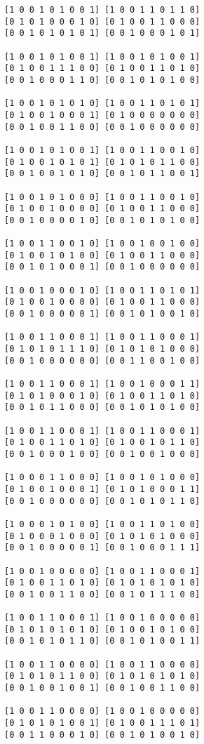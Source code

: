\begin{lstlisting}
[1 0 0 1 0 1 0 0 1] [1 0 0 1 1 0 1 1 0] 
[0 1 0 1 0 0 0 1 0] [0 1 0 0 1 1 0 0 0] 
[0 0 1 0 1 0 1 0 1] [0 0 1 0 0 0 1 0 1] 

[1 0 0 1 0 1 0 0 1] [1 0 0 1 0 1 0 0 1] 
[0 1 0 0 1 1 1 0 0] [0 1 0 0 1 1 0 1 0] 
[0 0 1 0 0 0 1 1 0] [0 0 1 0 1 0 1 0 0] 

[1 0 0 1 0 1 0 1 0] [1 0 0 1 1 0 1 0 1] 
[0 1 0 0 1 0 0 0 1] [0 1 0 0 0 0 0 0 0] 
[0 0 1 0 0 1 1 0 0] [0 0 1 0 0 0 0 0 0] 

[1 0 0 1 0 1 0 0 1] [1 0 0 1 1 0 0 1 0] 
[0 1 0 0 1 0 1 0 1] [0 1 0 1 0 1 1 0 0] 
[0 0 1 0 0 1 0 1 0] [0 0 1 0 1 1 0 0 1] 

[1 0 0 1 0 1 0 0 0] [1 0 0 1 1 0 0 1 0] 
[0 1 0 0 1 0 0 0 0] [0 1 0 0 1 1 0 0 0] 
[0 0 1 0 0 0 0 1 0] [0 0 1 0 1 0 1 0 0] 

[1 0 0 1 1 0 0 1 0] [1 0 0 1 0 0 1 0 0] 
[0 1 0 0 1 0 1 0 0] [0 1 0 0 1 1 0 0 0] 
[0 0 1 0 1 0 0 0 1] [0 0 1 0 0 0 0 0 0] 

[1 0 0 1 0 0 0 1 0] [1 0 0 1 1 0 1 0 1] 
[0 1 0 0 1 0 0 0 0] [0 1 0 0 1 1 0 0 0] 
[0 0 1 0 0 0 0 0 1] [0 0 1 0 1 0 0 1 0] 

[1 0 0 1 1 0 0 0 1] [1 0 0 1 1 0 0 0 1] 
[0 1 0 1 0 1 1 1 0] [0 1 0 1 0 1 0 0 0] 
[0 0 1 0 0 0 0 0 0] [0 0 1 1 0 0 1 0 0] 

[1 0 0 1 1 0 0 0 1] [1 0 0 1 0 0 0 1 1] 
[0 1 0 1 0 0 0 1 0] [0 1 0 0 1 1 0 1 0] 
[0 0 1 0 1 1 0 0 0] [0 0 1 0 1 0 1 0 0] 

[1 0 0 1 1 0 0 0 1] [1 0 0 1 1 0 0 0 1] 
[0 1 0 0 1 1 0 1 0] [0 1 0 0 1 0 1 1 0] 
[0 0 1 0 0 0 1 0 0] [0 0 1 0 0 1 0 0 0] 

[1 0 0 0 1 1 0 0 0] [1 0 0 1 0 1 0 0 0] 
[0 1 0 0 1 0 0 0 1] [0 1 0 1 0 0 0 1 1] 
[0 0 1 0 0 0 0 0 0] [0 0 1 0 1 0 1 1 0] 

[1 0 0 0 1 0 1 0 0] [1 0 0 1 1 0 1 0 0] 
[0 1 0 0 0 1 0 0 0] [0 1 0 1 0 1 0 0 0] 
[0 0 1 0 0 0 0 0 1] [0 0 1 0 0 0 1 1 1] 

[1 0 0 1 0 0 0 0 0] [1 0 0 1 1 0 0 0 1] 
[0 1 0 0 1 1 0 1 0] [0 1 0 1 0 1 0 1 0] 
[0 0 1 0 0 1 1 0 0] [0 0 1 0 1 1 1 0 0] 

[1 0 0 1 1 0 0 0 1] [1 0 0 1 0 0 0 0 0] 
[0 1 0 1 0 1 0 1 0] [0 1 0 0 1 0 1 0 0] 
[0 0 1 0 1 0 1 1 0] [0 0 1 0 1 0 0 1 1] 

[1 0 0 1 1 0 0 0 0] [1 0 0 1 1 0 0 0 0] 
[0 1 0 1 0 1 1 0 0] [0 1 0 1 0 1 0 1 0] 
[0 0 1 0 0 1 0 0 1] [0 0 1 0 0 1 1 0 0] 

[1 0 0 1 1 0 0 0 0] [1 0 0 1 0 0 0 0 0] 
[0 1 0 1 0 1 0 0 1] [0 1 0 0 1 1 1 0 1] 
[0 0 1 1 0 0 0 1 0] [0 0 1 0 1 0 0 1 0] 


\end{lstlisting}
